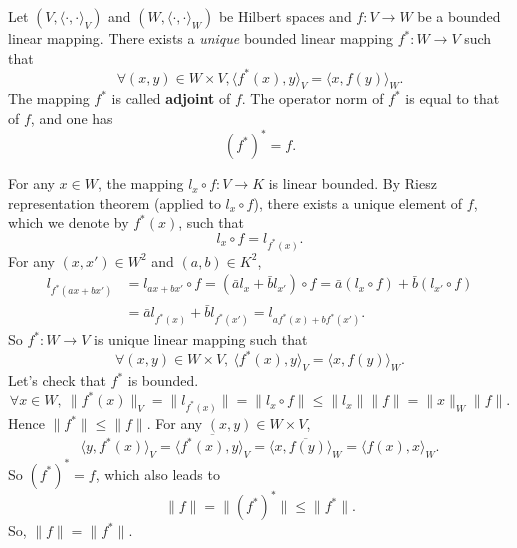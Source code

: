 \begin{corollaryenv}
    Let $\left(V, \langle \cdot,\cdot\rangle_V\right)$ and $\left(W, \langle \cdot,\cdot\rangle_W\right)$ be Hilbert spaces
    and $f: V\rightarrow W$ be a bounded linear mapping.
    There exists a \textit{unique} bounded linear mapping $f^*: W \rightarrow V$ such that 
    $$ \forall (x,y)\in W\times V, \langle f^*(x), y\rangle_V = \langle x, f(y) \rangle_W.$$
    The mapping $f^*$ is called \textbf{adjoint} of $f$.
    The operator norm of $f^*$ is equal to that of $f$, and one has
    $$ \left(f^*\right)^* = f.$$
\end{corollaryenv}
\begin{proofenv}
    For any $x\in W$, the mapping $l_x \circ f : V\rightarrow K$ is linear bounded.
    By Riesz representation theorem (applied to $l_x \circ f$), there exists a unique element of $f$, which we denote by $f^*(x)$, such that
    $$ l_x\circ f = l_{f^*(x)}.$$
    For any $(x,x')\in W^2$ and $(a,b)\in K^2$, 
    $$ \begin{aligned}
        l_{f^*(ax+bx')} &= l_{ax+bx'}\circ f = \left(\bar{a}l_x + \bar{b} l_{x'}\right)\circ f = \bar{a}\left(l_x \circ f\right) + \bar{b} \left(l_{x'} \circ f\right)\\
        &= \bar{a} l_{f^*(x)} + \bar{b} l_{f^*(x')} = l_{a f^*(x)+bf^*(x')}.
    \end{aligned}$$
    So $f^*: W\rightarrow V$ is unique linear mapping such that 
    $$ \forall (x,y)\in W\times V,\ \langle f^*(x), y\rangle_V = \langle x, f(y) \rangle_W.$$
    Let's check that $f^*$ is bounded.
    $$\forall x\in W,\ \| f^*(x)\|_V =\| l_{f^*(x)}\|  = \| l_x\circ f\| \le \|l_x\| \|f\| = \|x\|_{W} \|f\|.$$
    Hence $\| f^*\|\le \|f\|$. For any $(x,y)\in W\times V$,
    $$ \langle y, f^*(x)\rangle_V = \overline{\langle f^*(x), y\rangle_{V}} = \overline{\langle x, f(y)\rangle_W} = \langle f(x), x\rangle_W.$$
    So $\left(f^*\right)^* = f$, which also leads to 
    $$ \| f\| = \| \left(f^*\right) ^* \| \le \|f^*\|.$$
    So, $\|f\| = \|f^*\|$.
\end{proofenv}

